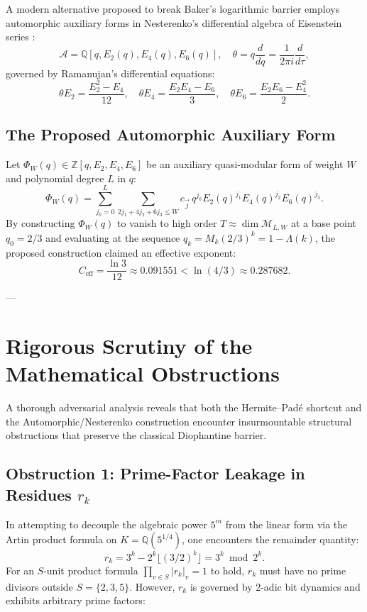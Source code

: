 \documentclass[11pt,reqno]{article}
\theoremstyle{plain}
\theoremstyle{definition}
\numberwithin{equation}{section}
\begin{document}
A modern alternative proposed to break Baker's logarithmic barrier employs automorphic auxiliary forms in Nesterenko's differential algebra of Eisenstein series \cite{nesterenko1996}:
\begin{equation}
\mathcal{A} = \mathbb{Q}[q, E_2(q), E_4(q), E_6(q)], \quad \theta = q \frac{d}{dq} = \frac{1}{2\pi i} \frac{d}{d\tau},
\end{equation}
governed by Ramanujan's differential equations:
\begin{equation}\label{eq:ramanujan_system}
\theta E_2 = \frac{E_2^2 - E_4}{12}, \quad \theta E_4 = \frac{E_2 E_4 - E_6}{3}, \quad \theta E_6 = \frac{E_2 E_6 - E_4^2}{2}.
\end{equation}

\subsection{The Proposed Automorphic Auxiliary Form}
Let $\Phi_W(q) \in \mathbb{Z}[q, E_2, E_4, E_6]$ be an auxiliary quasi-modular form of weight $W$ and polynomial degree $L$ in $q$:
\begin{equation}
\Phi_W(q) = \sum_{j_0=0}^L \sum_{2j_1+4j_2+6j_3 \le W} c_{\vec{j}} \, q^{j_0} E_2(q)^{j_1} E_4(q)^{j_2} E_6(q)^{j_3}.
\end{equation}
By constructing $\Phi_W(q)$ to vanish to high order $T \approx \dim \mathcal{M}_{L, W}$ at a base point $q_0 = 2/3$ and evaluating at the sequence $q_k = M_k (2/3)^k = 1 - \Lambda(k)$, the proposed construction claimed an effective exponent:
\begin{equation}
C_{\mathrm{eff}} = \frac{\ln 3}{12} \approx 0.091551 < \ln(4/3) \approx 0.287682.
\end{equation}

---

\section{Rigorous Scrutiny of the Mathematical Obstructions}

A thorough adversarial analysis reveals that both the Hermite--Pad\'e shortcut and the Automorphic/Nesterenko construction encounter insurmountable structural obstructions that preserve the classical Diophantine barrier.

\subsection{Obstruction 1: Prime-Factor Leakage in Residues $r_k$}
In attempting to decouple the algebraic power $5^m$ from the linear form via the Artin product formula on $K = \mathbb{Q}(5^{1/4})$, one encounters the remainder quantity:
\begin{equation}
r_k = 3^k - 2^k \lfloor(3/2)^k\rfloor = 3^k \bmod 2^k.
\end{equation}
For an $S$-unit product formula $\prod_{v \in S} |r_k|_v = 1$ to hold, $r_k$ must have no prime divisors outside $S = \{2, 3, 5\}$. However, $r_k$ is governed by 2-adic bit dynamics and exhibits arbitrary prime factors:
\end{document}

